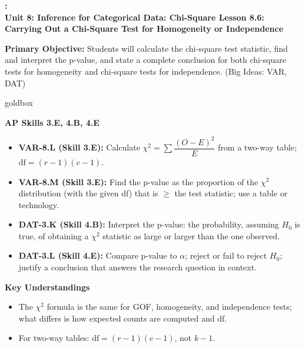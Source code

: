 \documentclass[10pt]{article}
\newcommand{\UnitNumberName}{Unit 8: Inference for Categorical Data: Chi-Square \quad}
\newcommand{\LessonNumberName}{Lesson 8.6: Carrying Out a Chi-Square Test for Homogeneity or Independence}
\begin{document}
\begin{center}
    {\Large\bfseries \CourseName: \SchoolYear \\
    {\small\bfseries \UnitNumberName \LessonNumberName}}
\end{center}

\begin{tcolorbox}[colback=sky, colframe=navy, boxrule=0.9pt, arc=2mm,
    left=2mm, right=2mm, top=1.5mm, bottom=1.5mm]
    \textbf{Primary Objective:} Students will calculate the chi-square test statistic,
    find and interpret the p-value, and state a complete conclusion for both
    chi-square tests for homogeneity and chi-square tests for independence.
    (Big Ideas: VAR, DAT)
\end{tcolorbox}

\renewcommand{\arraystretch}{1.6}
\begin{skillbox}{goldbox}
\begin{minipage}[t]{0.48\linewidth}
    \textbf{AP Skills 3.E, 4.B, 4.E}
    \begin{itemize}
        \item \textbf{VAR-8.L (Skill 3.E):} Calculate
              $\chi^2 = \sum \dfrac{(O - E)^2}{E}$ from a two-way table;
              $\text{df} = (r-1)(c-1)$.
        \item \textbf{VAR-8.M (Skill 3.E):} Find the p-value as the proportion of
              the $\chi^2$ distribution (with the given df) that is $\ge$ the test
              statistic; use a table or technology.
        \item \textbf{DAT-3.K (Skill 4.B):} Interpret the p-value: the probability,
              assuming $H_0$ is true, of obtaining a $\chi^2$ statistic as large or
              larger than the one observed.
        \item \textbf{DAT-3.L (Skill 4.E):} Compare p-value to $\alpha$; reject or
              fail to reject $H_0$; justify a conclusion that answers the research
              question in context.
    \end{itemize}
\end{minipage}
\hfill
\begin{minipage}[t]{0.48\linewidth}
    \textbf{Key Understandings}
    \begin{itemize}
        \item The $\chi^2$ formula is the same for GOF, homogeneity, and independence
              tests; what differs is how expected counts are computed and df.
        \item For two-way tables: $\text{df} = (r-1)(c-1)$, not $k-1$.

\end{itemize}
\end{minipage}
\end{skillbox}
\end{document}
